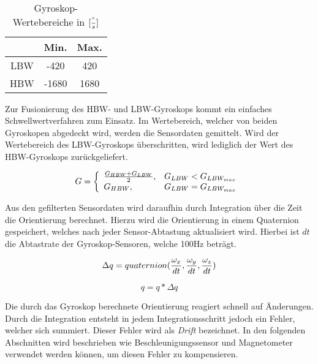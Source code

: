 \begin{table}[ht]
  \centering
  \begin{tabular}{ | c | c | c | }
    \hline
    & Min. & Max. \\ \hline
    \ac{LBW} & -420   & 420   \\ \hline
    \ac{HBW} & -1680   & 1680   \\
    \hline
  \end{tabular}
  \caption{Gyroskop-Wertebereiche in $[{\degree \over s}]$}
  \label{tab:ranges-gyros}
\end{table}


Zur Fusionierung des \ac{HBW}- und \ac{LBW}-Gyroskops kommt ein einfaches Schwellwertverfahren zum Einsatz. 
Im Wertebereich, welcher von beiden Gyroskopen abgedeckt wird, werden
die Sensordaten gemittelt. Wird der Wertebereich des \ac{LBW}-Gyroskops
überschritten, wird lediglich der Wert des \ac{HBW}-Gyroskops
zurückgeliefert.

\begin{equation}
    G = \left\{
    \begin{array}{ll}
        \frac{G_{HBW} + G_{LBW}}{2}, & G_{LBW} < G_{LBW_{max}}  \\
        G_{HBW}, & G_{LBW} = G_{LBW_{max}}
    \end{array}\right. \\
\end{equation}

Aus den gefilterten Sensordaten wird daraufhin durch Integration über
die Zeit die Orientierung berechnet. Hierzu wird die Orientierung in einem Quaternion gespeichert, welches nach jeder Sensor-Abtastung aktualisiert wird. Hierbei ist $dt$ die Abtastrate der Gyroskop-Sensoren, welche 100Hz beträgt.

\begin{equation}
    \Delta q = quaternion({\omega_x \over dt}, {\omega_y \over dt}, {\omega_z \over dt}) \\
\end{equation}

\begin{equation}
    q = q * \Delta q
\end{equation}

Die durch das Gyroskop berechnete Orientierung reagiert schnell auf
Änderungen. Durch die Integration entsteht in jedem Integrationsschritt jedoch ein Fehler, welcher sich summiert. Dieser Fehler wird als \emph{Drift} bezeichnet. In den folgenden Abschnitten wird beschrieben wie Beschleunigungssensor und Magnetometer verwendet werden können, um diesen Fehler zu kompensieren.


